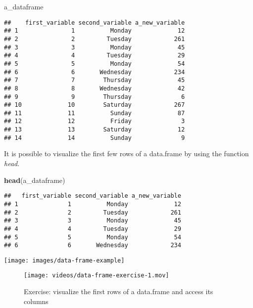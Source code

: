 \documentclass[
]{article}
\newenvironment{Shaded}{\begin{snugshade}}{\end{snugshade}}
\newcommand{\FunctionTok}[1]{\textcolor[rgb]{0.13,0.29,0.53}{\textbf{#1}}}
\newcommand{\NormalTok}[1]{#1}
\begin{document}
\begin{Shaded}
\begin{Highlighting}[]
\NormalTok{a\_dataframe}
\end{Highlighting}
\end{Shaded}

\begin{verbatim}
##    first_variable second_variable a_new_variable
## 1               1          Monday             12
## 2               2         Tuesday            261
## 3               3          Monday             45
## 4               4         Tuesday             29
## 5               5          Monday             54
## 6               6       Wednesday            234
## 7               7        Thursday             45
## 8               8       Wednesday             42
## 9               9        Thursday              6
## 10             10        Saturday            267
## 11             11          Sunday             87
## 12             12          Friday              3
## 13             13        Saturday             12
## 14             14          Sunday              9
\end{verbatim}

It is possible to visualize the first few rows of a data.frame by using the function \emph{head}.

\begin{Shaded}
\begin{Highlighting}[]
\FunctionTok{head}\NormalTok{(a\_dataframe)}
\end{Highlighting}
\end{Shaded}

\begin{verbatim}
##   first_variable second_variable a_new_variable
## 1              1          Monday             12
## 2              2         Tuesday            261
## 3              3          Monday             45
## 4              4         Tuesday             29
## 5              5          Monday             54
## 6              6       Wednesday            234
\end{verbatim}

\texttt{[image: images/data-frame-example]}

\begin{figure}
\centering
\texttt{[image: videos/data-frame-exercise-1.mov]}
\caption{Exercise: visualize the first rows of a data.frame and access its columns}
\end{figure}
\end{document}
